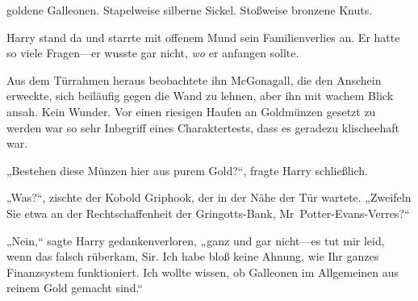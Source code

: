  goldene Galleonen. Stapelweise silberne Sickel. Stoßweise bronzene Knuts.

\hplettrineextrapara
Harry stand da und starrte mit offenem Mund sein Familienverlies an. Er hatte so viele Fragen—er wusste gar nicht, \emph{wo} er anfangen sollte.

Aus dem Türrahmen heraus beobachtete ihn McGonagall, die den Anschein erweckte, sich beiläufig gegen die Wand zu lehnen, aber ihn mit wachem Blick ansah. Kein Wunder. Vor einen riesigen Haufen an Goldmünzen gesetzt zu werden war so sehr Inbegriff eines Charaktertests, dass es geradezu klischeehaft war.

„Bestehen diese Münzen hier aus purem Gold?“, fragte Harry schließlich.

„Was?“, zischte der Kobold Griphook, der in der Nähe der Tür wartete. „Zweifeln Sie etwa an der Rechtschaffenheit der Gringotts-Bank, Mr~Potter-Evans-Verres?“

„Nein,“ sagte Harry gedankenverloren, „ganz und gar nicht—es tut mir leid, wenn das falsch rüberkam, Sir. Ich habe bloß keine Ahnung, wie Ihr ganzes Finanzsystem funktioniert. Ich wollte wissen, ob Galleonen im Allgemeinen aus reinem Gold gemacht sind.“

